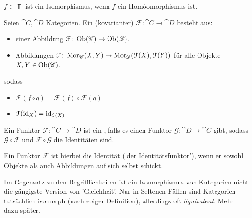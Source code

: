 \begin{example}
    $f\in  \Top$ ist ein Isomorphismus, wenn $f$ ein Homöomorphismus ist.
\end{example}

\begin{definition}[Funktor]\label{def:funktor}
    Seien $\cat{C},\cat{D}$ Kategorien. Ein (kovarianter)  $\mathcal{F} \colon \cat{C} \to  \cat{D}$ besteht aus:
    \begin{itemize}
        \item einer Abbildung $\mathcal{F} \colon \operatorname{Ob}(\mathscr{C}) \to  \operatorname{Ob}(\mathscr{D})$.
        \item Abbildungen $\mathcal{F}\colon \operatorname{Mor}_{\mathscr{C}}(X,Y) \to  \operatorname{Mor}_{\mathscr{D}}(\mathcal{F}(X),\mathcal{F}(Y))$ für alle Objekte $X,Y\in \operatorname{Ob}(\mathscr{C})$.
    \end{itemize}
    sodass
    \begin{itemize}
        \item $\mathcal{F}(f \circ  g) = \mathcal{F}(f) \circ \mathcal{F}(g)$ 
        \item $\mathcal{F}(\mathrm{id}_X) = \mathrm{id}_{\mathcal{F}(X)}$
    \end{itemize}
\end{definition}

\begin{definition}\label{def:funktor-isomorphismus}
    Ein Funktor $\mathcal{F} \colon \cat{C} \to  \cat{D}$ ist ein , falls es einen Funktor $\mathcal{G} \colon \cat{D} \to  \cat{C}$ gibt, sodass $\mathcal{G} \circ  \mathcal{F}$ und $\mathcal{F} \circ  \mathcal{G}$ die Identitäten sind.
\end{definition}
\begin{oral}
    Ein Funktor $\mathcal{F}$ ist hierbei die Identität ('der Identitätsfunktor'), wenn er sowohl Objekte als auch Abbildungen auf sich selbst schickt.
\end{oral}

\begin{doral}
    Im Gegensatz zu den Begrifflichkeiten ist ein Isomorphismus von Kategorien nicht die gängigste Version von 'Gleichheit'. Nur in Seltenen Fällen sind Kategorien tatsächlich isomorph (nach ebiger Definition), allerdings oft \textit{äquivalent}. Mehr dazu später.
\end{doral}

